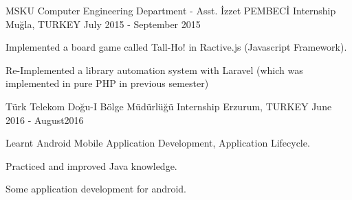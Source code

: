 \begin{cventries}
    \cventry
        {MSKU Computer Engineering Department - Asst. İzzet PEMBECİ}
        {Internship}
        {Muğla, TURKEY}
        {July 2015 - September 2015}
        {
          \begin{cvitems}
            \item {Implemented a board game called Tall-Ho! in Ractive.js (Javascript Framework).}
            \item {Re-Implemented a library automation system with Laravel (which was implemented in pure PHP in previous semester)}
          \end{cvitems}
        }
    \cventry
        {Türk Telekom Doğu-I Bölge Müdürlüğü}
        {Internship}
        {Erzurum, TURKEY}
        {June 2016 - August2016}
        {
            \begin{cvitems}
                \item {Learnt Android Mobile Application Development, Application Lifecycle.}
                \item {Practiced and improved Java knowledge.}
                \item {Some application development for android.}
            \end{cvitems}
        }

\end{cventries}

